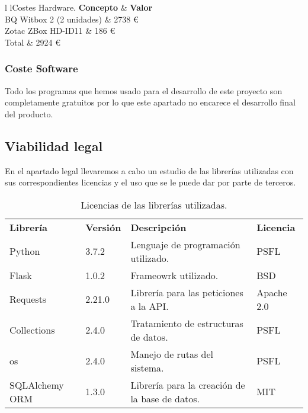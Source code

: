 {l l}{Costes Hardware.}
{\textbf{Concepto} & \textbf{Valor}\\}
{BQ Witbox 2 (2 unidades)		& 2738 \euro{}	\\
 Zotac ZBox HD-ID11 	     & 186 \euro{} \\
 \midrule
 Total					        & 2924 \euro{}\\
}

\subsubsection{Coste Software}

Todo los programas que hemos usado para el desarrollo de este proyecto son completamente gratuitos por lo que este apartado no encarece el desarrollo final del producto. 

\subsection{Viabilidad legal}

En el apartado legal llevaremos a cabo un estudio de las librerías utilizadas con sus correspondientes licencias y el uso que se le puede dar por parte de terceros.

\newpage


\begin{table}
  \begin{center}
    \begin{tabular}{p{4cm} p{1.5cm} p{6cm} p{3.5cm}}
      \toprule
      \textbf{Librería} & \textbf{Versión} & \textbf{Descripción} & \textbf{Licencia} \\
      \otoprule
      Python  & 3.7.2 & Lenguaje de programación utilizado. & PSFL \\
      Flask & 1.0.2 & Frameowrk utilizado. & BSD \\
      Requests & 2.21.0 & Librería para las peticiones a la API. & Apache 2.0 \\
      Collections & 2.4.0 & Tratamiento de estructuras de datos. & PSFL\\
      os & 2.4.0 & Manejo de rutas del sistema. & PSFL\\
      SQLAlchemy ORM  & 1.3.0 & Librería para la creación de la base de datos. & MIT\\
      \bottomrule
    \end{tabular}
    \caption{Licencias de las librerías utilizadas.}
    \label{tabla:licenses}
  \end{center}
\end{table}



